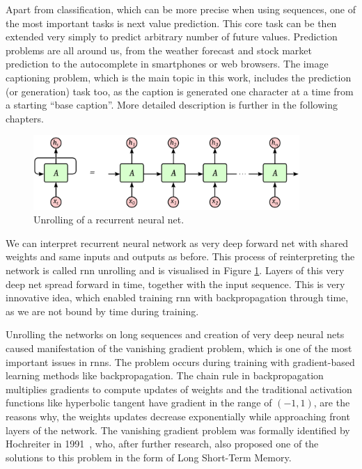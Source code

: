 Apart from classification, which can be more precise when using sequences, one of the most important tasks is next value prediction. This core task can be then extended very simply to predict arbitrary number of future values. Prediction problems are all around us, from the weather forecast and stock market prediction to the autocomplete in smartphones or web browsers. The image captioning problem, which is the main topic in this work, includes the prediction (or generation) task too, as the caption is generated one character at a time from a starting \textquotedblleft base caption\textquotedblright. More detailed description is further in the following chapters.

\begin{figure}[!t]
	\centering
	\includegraphics[width=0.9\textwidth]{fig/rnn-unrolled.pdf}
	\caption{Unrolling of a recurrent neural net.
		\label{fig:rnn-unroll}}
\end{figure}

We can interpret recurrent neural network as very deep forward net with shared weights and same inputs and outputs as before. This process of reinterpreting the network is called \gls{rnn} unrolling and is visualised in Figure \ref{fig:rnn-unroll}. Layers of this very deep net spread forward in time, together with the input sequence. This is very innovative idea, which enabled training \gls{rnn} with backpropagation through time, as we are not bound by time during training.

Unrolling the networks on long sequences and creation of very deep neural nets caused manifestation of the vanishing gradient problem, which is one of the most important issues in \gls{rnn}s. The problem occurs during training with gradient-based learning methods like backpropagation. The chain rule in backpropagation multiplies gradients  to compute updates of weights and the traditional activation functions like hyperbolic tangent have gradient in the range of $ (-1, 1) $, are the reasons why, the weights updates decrease exponentially while approaching front layers of the network. The vanishing gradient problem was formally identified by Hochreiter in 1991~\cite{hochreiter1991untersuchungen}, who, after further research, also proposed one of the solutions to this problem in the form of Long Short-Term Memory.

